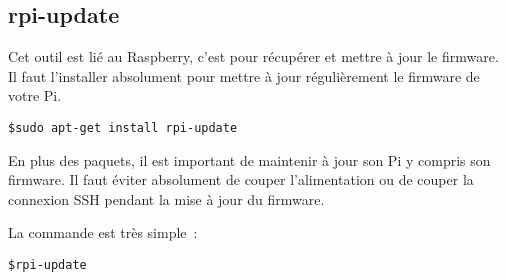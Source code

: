\subsection{rpi-update}

Cet outil est lié au Raspberry, c'est pour récupérer et mettre à jour le firmware. Il faut l'installer absolument pour mettre à jour régulièrement le firmware de votre Pi.

\begin{verbatim}
$sudo apt-get install rpi-update
\end{verbatim}

En plus des paquets, il est important de maintenir à jour son Pi y compris son firmware. Il faut éviter absolument de couper l'alimentation ou de couper la connexion SSH pendant la mise à jour du firmware.

La commande est très simple~:

\begin{verbatim}
$rpi-update
\end{verbatim}

